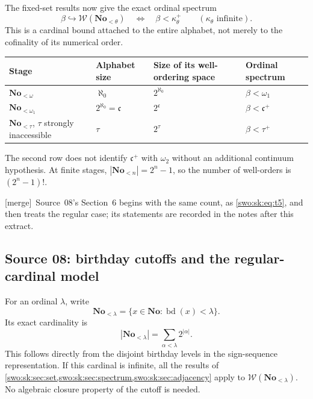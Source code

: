 \documentclass[11pt]{article}
\theoremstyle{definition}
\theoremstyle{remark}
\newcommand{\No}{\mathbf{No}}
\newcommand{\WO}{\mathcal W}
\newcommand{\W}{\mathcal W}
\newcommand{\bd}{\operatorname{bd}}
\newcommand{\emb}{\hookrightarrow}
\newcommand{\merge}{\textsf{[merge]}}
\begin{document}
The fixed-set results now give the exact ordinal spectrum
\begin{equation}
 \beta\emb\WO(\No_{<\theta})
       \quad\Longleftrightarrow\quad
 \beta<\kappa_\theta^+
 \qquad (\kappa_\theta\text{ infinite}).
 \label{swo:ec:eq:stage-spectrum}
\end{equation}
This is a cardinal bound attached to the entire alphabet, not merely to
the cofinality of its numerical order.

\begin{center}
\begin{tabularx}{\textwidth}{@{}lYYY@{}}
\toprule
Stage & Alphabet size & Size of its well-ordering space & Ordinal spectrum\\
\midrule
$\No_{<\omega}$ & $\aleph_0$ & $2^{\aleph_0}$ & $\beta<\omega_1$\\
$\No_{<\omega_1}$ & $2^{\aleph_0}=\mathfrak c$ & $2^{\mathfrak c}$ & $\beta<\mathfrak c^+$\\
$\No_{<\tau}$, $\tau$ strongly inaccessible & $\tau$ & $2^\tau$ & $\beta<\tau^+$\\
\bottomrule
\end{tabularx}
\end{center}
The second row does not identify $\mathfrak c^+$ with $\omega_2$ without
an additional continuum hypothesis. At finite stages,
$|\No_{<n}|=2^n-1$, so the number of well-orders is $(2^n-1)!$.


\merge\ Source~08's Section~6 begins with the same count, as
\eqref{swo:sk:eq:t5}, and then treats the regular case; its statements are
recorded in the notes after this extract.

\subsection{Source 08: birthday cutoffs and the regular-cardinal model}\label{swo:sk:sec:cutoffs}

For an ordinal $\lambda$, write
\[
                  \No_{<\lambda}
                  =\{x\in\No:\bd(x)<\lambda\}.
\]
Its exact cardinality is
\[
               |\No_{<\lambda}|=\sum_{\alpha<\lambda}2^{|\alpha|}.
                                                               \tag{S08.5}\label{swo:sk:eq:t5}
\]
This follows directly from the disjoint birthday levels in the
sign-sequence representation. If this cardinal is infinite, all the
results of \cref{swo:sk:sec:set,swo:sk:sec:spectrum,swo:sk:sec:adjacency} apply to
$\W(\No_{<\lambda})$. No algebraic closure property of the cutoff is needed.
\end{document}
